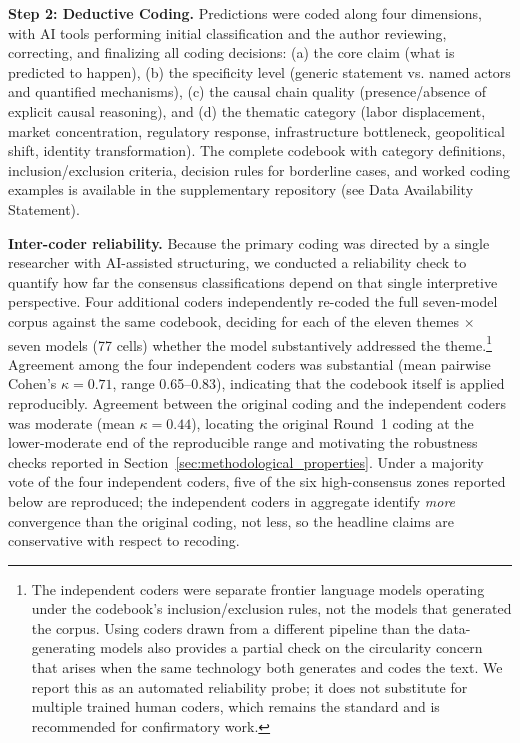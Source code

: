 \documentclass[preprint,review,12pt]{elsarticle}
\begin{document}
\textbf{Step 2: Deductive Coding.} Predictions were coded along four dimensions, with AI tools performing initial classification and the author reviewing, correcting, and finalizing all coding decisions: (a) the core claim (what is predicted to happen), (b) the specificity level (generic statement vs. named actors and quantified mechanisms), (c) the causal chain quality (presence/absence of explicit causal reasoning), and (d) the thematic category (labor displacement, market concentration, regulatory response, infrastructure bottleneck, geopolitical shift, identity transformation). The complete codebook with category definitions, inclusion/exclusion criteria, decision rules for borderline cases, and worked coding examples is available in the supplementary repository (see Data Availability Statement).

\textbf{Inter-coder reliability.} Because the primary coding was directed by a single researcher with AI-assisted structuring, we conducted a reliability check to quantify how far the consensus classifications depend on that single interpretive perspective. Four additional coders independently re-coded the full seven-model corpus against the same codebook, deciding for each of the eleven themes $\times$ seven models (77 cells) whether the model substantively addressed the theme.\footnote{The independent coders were separate frontier language models operating under the codebook's inclusion/exclusion rules, not the models that generated the corpus. Using coders drawn from a different pipeline than the data-generating models also provides a partial check on the circularity concern that arises when the same technology both generates and codes the text. We report this as an automated reliability probe; it does not substitute for multiple trained human coders, which remains the standard and is recommended for confirmatory work.} Agreement among the four independent coders was substantial (mean pairwise Cohen's $\kappa=0.71$, range 0.65--0.83), indicating that the codebook itself is applied reproducibly. Agreement between the original coding and the independent coders was moderate (mean $\kappa=0.44$), locating the original Round~1 coding at the lower-moderate end of the reproducible range and motivating the robustness checks reported in Section~\ref{sec:methodological_properties}. Under a majority vote of the four independent coders, five of the six high-consensus zones reported below are reproduced; the independent coders in aggregate identify \emph{more} convergence than the original coding, not less, so the headline claims are conservative with respect to recoding.
\end{document}
